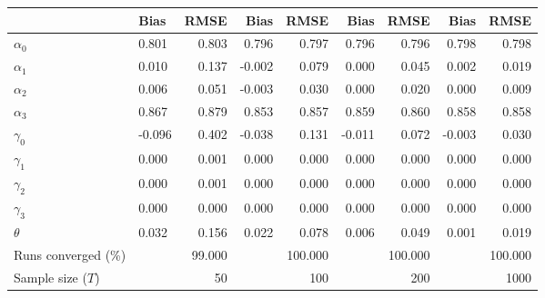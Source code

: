 
\begin{tabular}[t]{llrrrrrrr}
\toprule
  & Bias & RMSE & Bias & RMSE & Bias & RMSE & Bias & RMSE\\
\midrule
$\alpha_{0}$ & 0.801 & 0.803 & 0.796 & 0.797 & 0.796 & 0.796 & 0.798 & 0.798\\
$\alpha_{1}$ & 0.010 & 0.137 & -0.002 & 0.079 & 0.000 & 0.045 & 0.002 & 0.019\\
$\alpha_{2}$ & 0.006 & 0.051 & -0.003 & 0.030 & 0.000 & 0.020 & 0.000 & 0.009\\
$\alpha_{3}$ & 0.867 & 0.879 & 0.853 & 0.857 & 0.859 & 0.860 & 0.858 & 0.858\\
$\gamma_{0}$ & -0.096 & 0.402 & -0.038 & 0.131 & -0.011 & 0.072 & -0.003 & 0.030\\
$\gamma_{1}$ & 0.000 & 0.001 & 0.000 & 0.000 & 0.000 & 0.000 & 0.000 & 0.000\\
$\gamma_{2}$ & 0.000 & 0.001 & 0.000 & 0.000 & 0.000 & 0.000 & 0.000 & 0.000\\
$\gamma_{3}$ & 0.000 & 0.000 & 0.000 & 0.000 & 0.000 & 0.000 & 0.000 & 0.000\\
$\theta$ & 0.032 & 0.156 & 0.022 & 0.078 & 0.006 & 0.049 & 0.001 & 0.019\\
Runs converged (\%) &  & 99.000 &  & 100.000 &  & 100.000 &  & 100.000\\
Sample size ($T$) &  & 50 &  & 100 &  & 200 &  & 1000\\
\bottomrule
\end{tabular}
